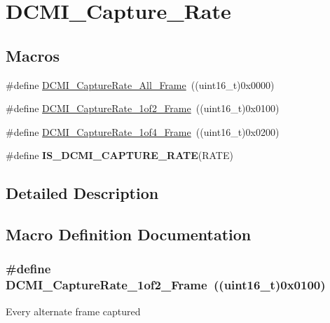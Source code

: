 \hypertarget{group___d_c_m_i___capture___rate}{\section{D\-C\-M\-I\-\_\-\-Capture\-\_\-\-Rate}
\label{group___d_c_m_i___capture___rate}
}
\subsection*{Macros}
\begin{DoxyCompactItemize}
\item 
\#define \hyperlink{group___d_c_m_i___capture___rate_gac6fe1a56c081942ad0398e727280f4b5}{D\-C\-M\-I\-\_\-\-Capture\-Rate\-\_\-\-All\-\_\-\-Frame}~((uint16\-\_\-t)0x0000)
\item 
\#define \hyperlink{group___d_c_m_i___capture___rate_ga9f89cbc2c2af326e029327603b2b5e78}{D\-C\-M\-I\-\_\-\-Capture\-Rate\-\_\-1of2\-\_\-\-Frame}~((uint16\-\_\-t)0x0100)
\item 
\#define \hyperlink{group___d_c_m_i___capture___rate_gab1cffa0fc41d2dabe1320370060434f2}{D\-C\-M\-I\-\_\-\-Capture\-Rate\-\_\-1of4\-\_\-\-Frame}~((uint16\-\_\-t)0x0200)
\item 
\#define {\bfseries I\-S\-\_\-\-D\-C\-M\-I\-\_\-\-C\-A\-P\-T\-U\-R\-E\-\_\-\-R\-A\-T\-E}(R\-A\-T\-E)
\end{DoxyCompactItemize}


\subsection{Detailed Description}


\subsection{Macro Definition Documentation}
\hypertarget{group___d_c_m_i___capture___rate_ga9f89cbc2c2af326e029327603b2b5e78}{
\subsubsection[{D\-C\-M\-I\-\_\-\-Capture\-Rate\-\_\-1of2\-\_\-\-Frame}]{\setlength{\rightskip}{0pt plus 5cm}\#define D\-C\-M\-I\-\_\-\-Capture\-Rate\-\_\-1of2\-\_\-\-Frame~((uint16\-\_\-t)0x0100)}}\label{group___d_c_m_i___capture___rate_ga9f89cbc2c2af326e029327603b2b5e78}
Every alternate frame captured 

